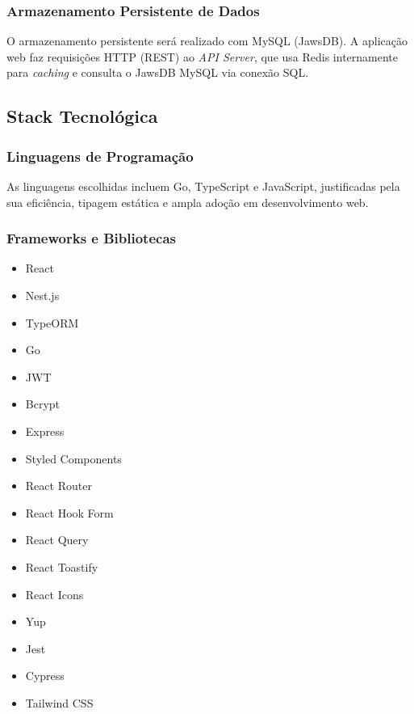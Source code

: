 \documentclass[12pt, a4paper]{article}
\begin{document}
\subsubsection{Armazenamento Persistente de Dados}
\begin{spacing}{1.5}
O armazenamento persistente será realizado com MySQL (JawsDB). A aplicação web faz requisições HTTP (REST) ao \textit{API Server}, que usa Redis internamente para \textit{caching} e consulta o JawsDB MySQL via conexão SQL.
\end{spacing}

\subsection{Stack Tecnológica}
\begin{spacing}{1.5}
\subsubsection{Linguagens de Programação}
As linguagens escolhidas incluem Go, TypeScript e JavaScript, justificadas pela sua eficiência, tipagem estática e ampla adoção em desenvolvimento web.

\subsubsection{Frameworks e Bibliotecas}
\begin{spacing}{1.5}
\begin{itemize}
    \item React
    \item Nest.js
    \item TypeORM
    \item Go
    \item JWT
    \item Bcrypt
    \item Express
    \item Styled Components
    \item React Router
    \item React Hook Form
    \item React Query
    \item React Toastify
    \item React Icons
    \item Yup
    \item Jest
    \item Cypress
    \item Tailwind CSS
\end{itemize}
\end{spacing}


\end{spacing}
\end{document}
